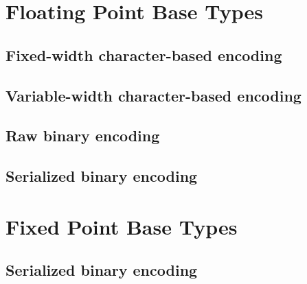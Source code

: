 \section{Floating Point Base Types}

\subsection{Fixed-width character-based encoding}

\aedBegin{}
\aedEnd{}

\begin{tinycodeaux}{\leftmargin=0in}
\end{tinycodeaux}

\subsection{Variable-width character-based encoding}

\aedBegin{}
\aedEnd{}

\begin{tinycodeaux}{\leftmargin=0in}
\end{tinycodeaux}

\subsection{Raw binary encoding}

\bBegin{}
\bEnd{}

\begin{tinycodeaux}{\leftmargin=0in}
\end{tinycodeaux}

\subsection{Serialized binary encoding}

\sbBegin{}
\sbEnd{}

\begin{tinycodeaux}{\leftmargin=0in}
\end{tinycodeaux}

\section{Fixed Point Base Types}

\subsection{Serialized binary encoding}

